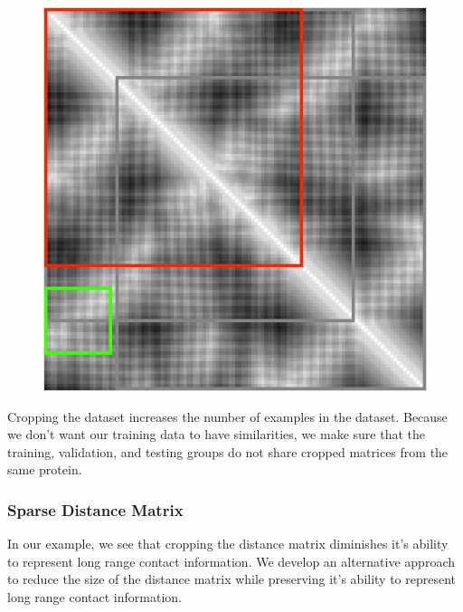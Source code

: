 \documentclass[12pt, a4paper, twocolumn, fullpage]{article}
\theoremstyle{plain}
\theoremstyle{definition}
\theoremstyle{remark}
\begin{document}
\begin{figure}[h]
	\centering
	\includegraphics[width=\linewidth]{cropMatMiss}
	\caption{}
	\label{fig:network}
\end{figure}

Cropping the dataset increases the number of examples in the dataset. Because we don't want our training data to have similarities, we make sure that the training, validation, and testing groups do not share cropped matrices from the same protein.

\subsubsection{ Sparse Distance Matrix}

In our example, we see that cropping the distance matrix diminishes it's ability to represent long range contact information. We develop an alternative approach to reduce the size of the distance matrix while preserving it's ability to represent long range contact information.
\end{document}

